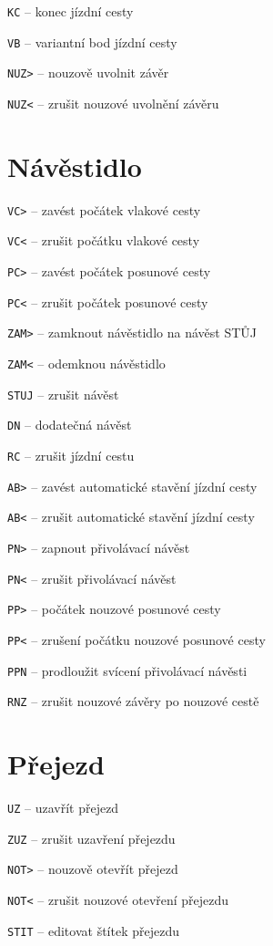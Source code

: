 \documentclass[12pt,a4paper,landscape]{article}
\begin{document}
\begin{multicols}{3}
\begin{compactitem}
	\item \texttt{KC} -- konec jízdní cesty
	\item \texttt{VB} -- variantní bod jízdní cesty
	
	\item \texttt{NUZ>} -- nouzově uvolnit závěr
	\item \texttt{NUZ<} -- zrušit nouzové uvolnění závěru	
\end{compactitem}	

\section{Návěstidlo}
\begin{compactitem}
	\item \texttt{VC>} -- zavést počátek vlakové cesty
	\item \texttt{VC<} -- zrušit počátku vlakové cesty
	\item \texttt{PC>} -- zavést počátek posunové cesty
	\item \texttt{PC<} -- zrušit počátek posunové cesty
	\item \texttt{ZAM>} -- zamknout návěstidlo na návěst STŮJ
	\item \texttt{ZAM<} -- odemknou návěstidlo
	\item \texttt{STUJ} -- zrušit návěst
	\item \texttt{DN} -- dodatečná návěst
	\item \texttt{RC} -- zrušit jízdní cestu
	\item \texttt{AB>} -- zavést automatické stavění jízdní cesty
	\item \texttt{AB<} -- zrušit automatické stavění jízdní cesty
	\item \texttt{PN>} -- zapnout přivolávací návěst
	\item \texttt{PN<} -- zrušit přivolávací návěst
	\item \texttt{PP>} -- počátek nouzové posunové cesty
	\item \texttt{PP<} -- zrušení počátku nouzové posunové cesty
	\item \texttt{PPN} -- prodloužit svícení přivolávací návěsti
	\item \texttt{RNZ} -- zrušit nouzové závěry po nouzové cestě
\end{compactitem}	

\section{Přejezd}
\begin{compactitem}
	\item \texttt{UZ} -- uzavřít přejezd
	\item \texttt{ZUZ} -- zrušit uzavření přejezdu
	\item \texttt{NOT>} -- nouzově otevřít přejezd
	\item \texttt{NOT<} -- zrušit nouzové otevření přejezdu
	\item \texttt{STIT} -- editovat štítek přejezdu	
\end{compactitem}


\end{multicols}
\end{document}
